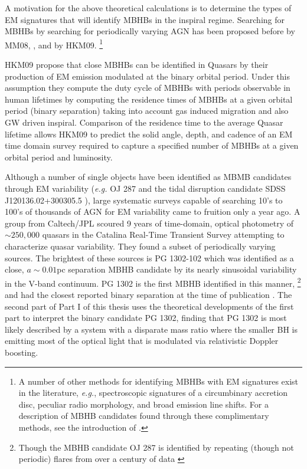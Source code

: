 A motivation for the above theoretical calculations is to
determine the types of EM signatures that will identify MBHBs in the inspiral
regime. Searching for MBHBs by searching for periodically varying AGN has been
proposed before by MM08, \cite{Haiman+2009}, and by HKM09. \footnote{A number
of other methods for identifying MBHBs with EM signatures exist in the
literature, \textit{e.g.}, spectroscopic signatures of a circumbinary accretion
disc, peculiar radio morphology, and broad emission line shifts. For a description of
MBHB candidates found through these complimentary methods, see the
introduction of \cite{Charisi+2016}.}
 

HKM09 propose that close MBHBs can be identified in Quasars by their
production of EM emission modulated at the binary orbital period. Under this
assumption they compute the duty cycle of MBHBs with periods observable in
human lifetimes by computing the residence times of MBHBs at a given orbital
period (binary separation) taking into account gas induced migration and also
GW driven inspiral. Comparison of the residence time to the average Quasar
lifetime allows HKM09 to predict the solid angle, depth, and cadence of an EM
time domain survey required to capture a specified number of MBHBs at a given
orbital period and luminosity.

Although a number of single objects have been identified as MBMB candidates
through EM variability (\textit{e.g.} OJ 287 \citep{LehtoValtonen1996} and the
tidal disruption candidate SDSS J120136.02+300305.5 \citep{LiuKomossa:2014}),
large systematic surveys capable of searching 10's to 100's of thousands of
AGN for EM variability came to fruition only a year ago. A group from
Caltech/JPL scoured 9 years of time-domain, optical photometry of
$\sim250,000$ quasars in the Catalina Real-Time Transient Survey
\citep[CRTS][]{CRTS1:Drake:2009, CRTS2:Djorgovski:2010, CRTS3:2011Mahabal,
CRTS4:Djorgovski:2011} attempting to characterize quasar variability. They
found a subset of periodically varying sources. The brightest of these sources
is PG 1302-102 which was identified as a close, $a \sim 0.01$pc separation
MBHB candidate by its nearly sinusoidal variability in the V-band continuum.
PG 1302 is the first MBHB identified in this manner, \footnote{Though the MBHB
candidate OJ 287 is identified by repeating (though not periodic) flares from
over a century of data \citep{LehtoValtonen1996, Pursimo:2000}} and had the
closest reported binary separation at the time of publication
\citep{Graham+2015a}. The second part of Part I of this thesis uses the
theoretical developments of the first part to interpret the binary candidate
PG 1302, finding that PG 1302 is most likely described by a system with a
disparate mass ratio where the smaller BH is emitting most of the optical
light that is modulated via relativistic Doppler boosting.


